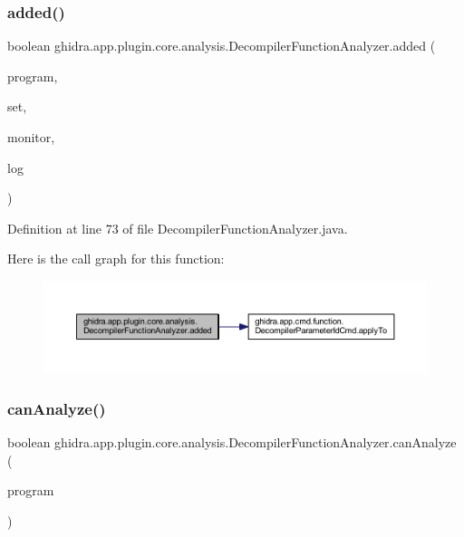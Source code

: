 \subsubsection{\texorpdfstring{added()}{added()}}
{\footnotesize\ttfamily boolean ghidra.\+app.\+plugin.\+core.\+analysis.\+Decompiler\+Function\+Analyzer.\+added (\begin{DoxyParamCaption}\item[{Program}]{program,  }\item[{Address\+Set\+View}]{set,  }\item[{Task\+Monitor}]{monitor,  }\item[{Message\+Log}]{log }\end{DoxyParamCaption})\hspace{0.3cm}{\ttfamily [inline]}}



Definition at line 73 of file Decompiler\+Function\+Analyzer.\+java.

Here is the call graph for this function\+:
\nopagebreak
\begin{figure}[H]
\begin{center}
\leavevmode
\includegraphics[width=350pt]{classghidra_1_1app_1_1plugin_1_1core_1_1analysis_1_1_decompiler_function_analyzer_a8b7be13bc0b90560b10fa9d76472746b_cgraph}
\end{center}
\end{figure}
\mbox{\label{classghidra_1_1app_1_1plugin_1_1core_1_1analysis_1_1_decompiler_function_analyzer_a126548adad0c4cb3ec47954ebb39cb16}} 
\subsubsection{\texorpdfstring{canAnalyze()}{canAnalyze()}}
{\footnotesize\ttfamily boolean ghidra.\+app.\+plugin.\+core.\+analysis.\+Decompiler\+Function\+Analyzer.\+can\+Analyze (\begin{DoxyParamCaption}\item[{Program}]{program }\end{DoxyParamCaption})\hspace{0.3cm}{\ttfamily [inline]}}



